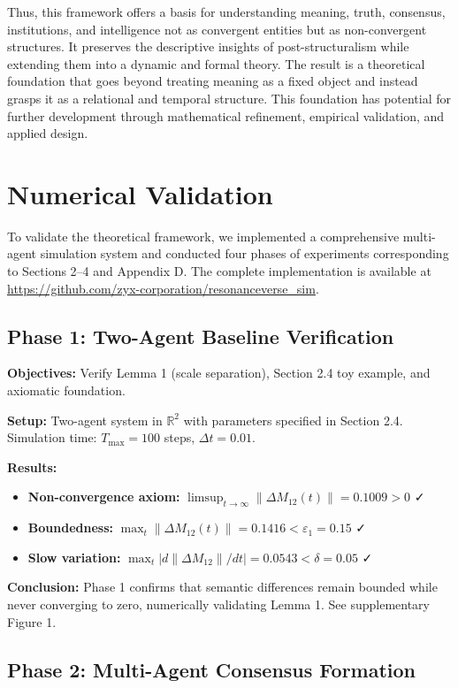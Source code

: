 \documentclass[11pt,a4paper]{article}
\theoremstyle{definition}
\begin{document}
Thus, this framework offers a basis for understanding meaning, truth, consensus, institutions, and intelligence not as convergent entities but as non-convergent structures. It preserves the descriptive insights of post-structuralism while extending them into a dynamic and formal theory. The result is a theoretical foundation that goes beyond treating meaning as a fixed object and instead grasps it as a relational and temporal structure. This foundation has potential for further development through mathematical refinement, empirical validation, and applied design.

\section{Numerical Validation}

To validate the theoretical framework, we implemented a comprehensive multi-agent simulation system and conducted four phases of experiments corresponding to Sections 2--4 and Appendix D. The complete implementation is available at \url{https://github.com/zyx-corporation/resonanceverse_sim}.

\subsection{Phase 1: Two-Agent Baseline Verification}

\textbf{Objectives:} Verify Lemma 1 (scale separation), Section 2.4 toy example, and axiomatic foundation.

\textbf{Setup:} Two-agent system in $\mathbb{R}^2$ with parameters specified in Section 2.4. Simulation time: $T_{\max} = 100$ steps, $\Delta t = 0.01$.

\textbf{Results:}
\begin{itemize}
\item \textbf{Non-convergence axiom:} $\limsup_{t \to \infty} \|\Delta M_{12}(t)\| = 0.1009 > 0$ ✓
\item \textbf{Boundedness:} $\max_t \|\Delta M_{12}(t)\| = 0.1416 < \varepsilon_1 = 0.15$ ✓
\item \textbf{Slow variation:} $\max_t |d\|\Delta M_{12}\|/dt| = 0.0543 < \delta = 0.05$ ✓
\end{itemize}

\textbf{Conclusion:} Phase 1 confirms that semantic differences remain bounded while never converging to zero, numerically validating Lemma 1. See supplementary Figure 1.

\subsection{Phase 2: Multi-Agent Consensus Formation}
\end{document}
